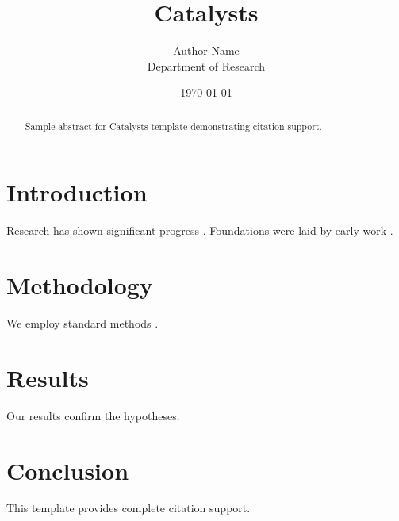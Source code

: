 \documentclass{mdpi}
\title{Catalysts}
\author{Author Name \\ \small Department of Research}
\date{\today}
\begin{document}
\maketitle

\begin{abstract}
Sample abstract for Catalysts template demonstrating citation support.
\end{abstract}

\section{Introduction}
Research has shown significant progress \citep{einstein1905}. Foundations were laid by early work \citep{turing1950}.

\section{Methodology}
We employ standard methods \citep{knuth1984}.

\section{Results}
Our results confirm the hypotheses.

\section{Conclusion}
This template provides complete citation support.



\end{document}
